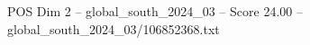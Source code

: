 \begin{textsample}{POS Dim 2 – global\_south\_2024\_03 – Score 24.00 – global\_south\_2024\_03/106852368.txt}
\end{textsample}
